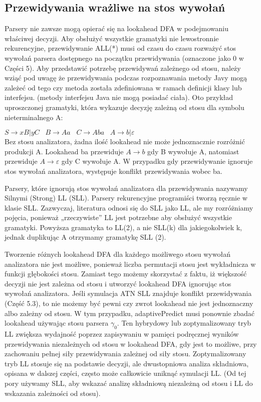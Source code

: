 \subsection{Przewidywania wrażliwe na stos wywołań}
Parsery nie zawsze mogą opierać się na lookahead DFA w podejmowaniu właściwej decyzji.
Aby obsłużyć wszystkie gramatyki nie lewostronnie rekurencyjne,
przewidywanie ALL(*) musi od czasu do czasu rozważyć stos wywołań parsera
dostępnego na początku przewidywania (oznaczone jako 0 w Części 5).
Aby przedstawić potrzebę przewidywań zależnego od stosu, należy wziąć pod uwagę
że przewidywania podczas rozpoznawania metody Javy mogą zależeć od tego
czy metoda została zdefiniowana w ramach definicji klasy lub interfejsu.
(metody interfejsu Java nie mogą posiadać ciała).
Oto przykład uproszczonej gramatyki, która wykazuje decyzję zależną od stosu dla symbolu nieterminalnego A:
\par
\( S \rightarrow xB|yC  \;\;\; B \rightarrow Aa \;\;\; C \rightarrow Aba \;\;\; A \rightarrow b|\varepsilon\)
\\
Bez stosu analizatora, żadna ilość lookahead nie może jednoznacznie rozróżnić
produkcji A. Lookahead ba przewiduje \(A \rightarrow b\) gdy B wywołuje A,
natomiast przewiduje \(A \rightarrow \varepsilon \) gdy C wywołuje A.
W przypadku gdy przewidywanie ignoruje stos wywołań analizatora,
występuje konflikt przewidywania wobec ba.
\par
Parsery, które ignorują stos wywołań analizatora dla przewidywania nazywamy
Silnymi (Strong) LL (SLL). Parsery rekurencyjne programiści tworzą ręcznie
w klasie SLL. Zazwyczaj, literatura odnosi się do SLL jako LL,
ale my rozróżniamy pojęcia, ponieważ „rzeczywiste” LL jest potrzebne aby
obsłużyć wszystkie gramatyki. Powyższa gramatyka to LL(2), a nie SLL(k) dla
jakiegokolwiek k, jednak duplikując A otrzymamy gramatykę SLL (2).
\par
Tworzenie różnych lookahead DFA dla każdego możliwego stosu wywołań
analizatora nie jest możliwe, ponieważ liczba permutacji stosu jest
wykładnicza w funkcji głębokości stosu.
Zamiast tego możemy skorzystać z faktu, iż większość decyzji nie jest zależna
od stosu i utworzyć lookahead DFA ignorując stos wywołań analizatora.
Jeśli symulacja ATN SLL znajduje konflikt przewidywania (Część 5.3),
to nie możemy być pewni czy zwrot lookahead nie jest jednoznaczny
albo zależny od stosu. 
W tym przypadku, adaptivePredict musi ponownie zbadać lookahead używając stosu parsera $\gamma_0$.
Ten hybrydowy lub zoptymalizowany tryb LL zwiększa wydajność poprzez zapisywaniu
w pamięci podręcznej wyników przewidywania niezależnych od stosu w lookahead DFA,
gdy jest to możliwe, przy zachowaniu pełnej siły przewidywania zależnej od siły stosu.
Zoptymalizowany tryb LL stosuje się na podstawie decyzji,
ale dwustopniowa analiza składniowa, opisana w dalszej części,
często może całkowicie uniknąć symulacji LL.
(Od tej pory używamy SLL, aby wskazać analizę składniową niezależną od stosu
i LL do wskazania zależności od stosu).
